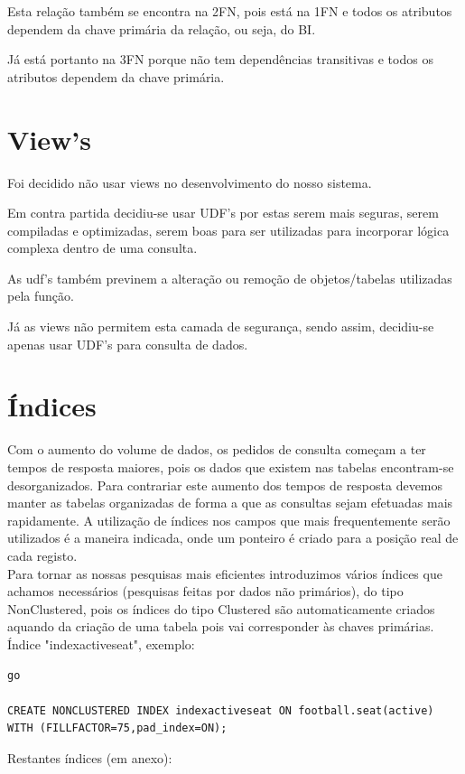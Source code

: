 \documentclass[pdftex,12pt,a4paper]{report}
\begin{document}
Esta relação também se encontra na 2FN, pois está na 1FN e todos os atributos dependem da chave primária da relação, ou seja, do BI.

Já está portanto na 3FN porque não tem dependências transitivas e todos os atributos dependem da chave primária.

\section{View's}
Foi decidido não usar views no desenvolvimento do nosso sistema. 

Em contra partida decidiu-se usar UDF's por estas serem mais seguras, serem compiladas e optimizadas, serem boas para ser utilizadas para incorporar lógica complexa dentro de uma consulta. 

As udf's também previnem a alteração ou remoção de objetos/tabelas utilizadas pela função.

Já as views não permitem esta camada de segurança, sendo assim, decidiu-se apenas usar UDF's para consulta de dados.

\newpage
\section{Índices}
Com o aumento do volume de dados, os pedidos de consulta começam a ter tempos de resposta maiores, pois os dados que existem nas tabelas encontram-se desorganizados. Para contrariar este aumento dos tempos de resposta devemos manter as tabelas organizadas de forma a que as consultas sejam efetuadas mais rapidamente. A utilização de índices nos campos que mais frequentemente serão utilizados é a maneira indicada, onde um ponteiro é criado para a posição real de cada registo.
\\

	Para tornar as nossas pesquisas mais eficientes introduzimos vários índices que achamos necessários (pesquisas feitas por dados não primários), do tipo NonClustered, pois os índices do tipo Clustered são automaticamente criados aquando da criação de uma tabela pois vai corresponder às chaves primárias.
\\

Índice "indexactiveseat", exemplo:
\\

\begin{lstlisting}
go

CREATE NONCLUSTERED INDEX indexactiveseat ON football.seat(active)
WITH (FILLFACTOR=75,pad_index=ON);
\end{lstlisting}
 \vspace{0,5in}
Restantes índices (em anexo):
\\
\end{document}
